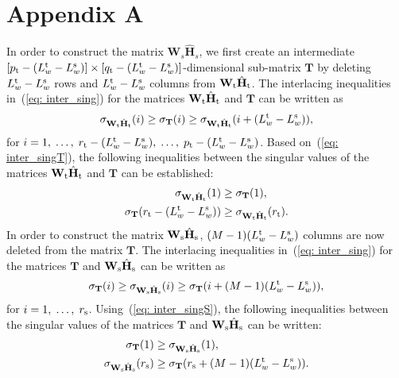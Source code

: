 \documentclass[twocolumn]{bmcart}%
\begin{document}
\section*{Appendix A}
\label{app: sing_vals}
In order to construct the matrix $\mathbf{W}_s\hat{\mathbf{H}}_s$, we first create an intermediate $[p_{\rm t}-(L^{\rm t}_w-L^{\rm s}_w)] \times [q_{\rm t}-(L^{\rm t}_w-L^{\rm s}_w)]$-dimensional sub-matrix $\mathbf{T}$ by deleting $L^{\rm t}_w-L^{\rm s}_w$ rows and $L^{\rm t}_w-L^{\rm s}_w$ columns from $\mathbf{W}_{\rm t}\hat{\mathbf{H}}_{\rm t}$.
The interlacing inequalities in~(\ref{eq: inter_sing}) for the matrices $\mathbf{W}_{\rm t}\hat{\mathbf{H}}_{\rm t}$ and $\mathbf{T}$ can be written as
\begin{equation}
\label{eq: inter_singT}
\sigma_{\mathbf{W}_{\rm t}\hat{\mathbf{H}}_{\rm t}}(i) \geq \sigma_{\mathbf{T}}(i) \geq \sigma_{\mathbf{W}_{\rm t}\hat{\mathbf{H}}_{\rm t}}(i+(L^{\rm t}_w-L^{\rm s}_w)),
\end{equation}
for $i = 1, \; \ldots, \; r_{\rm t}-(L^{\rm t}_w-L^{\rm s}_w), \; \ldots, \; p_{\rm t}-(L^{\rm t}_w-L^{\rm s}_w)$.
Based on~(\ref{eq: inter_singT}), the following inequalities between the singular values of the matrices $\mathbf{W}_{\rm t}\hat{\mathbf{H}}_{\rm t}$ and $\mathbf{T}$ can be established:
\begin{align}
\label{eq: ineq1}
\sigma_{\mathbf{W}_{\rm t}\hat{\mathbf{H}}_{\rm t}}(1) & \geq \sigma_{\mathbf{T}}(1), \\
\label{eq: ineq2}
\sigma_{\mathbf{T}}(r_{\rm t}-(L^{\rm t}_w-L^{\rm s}_w)) &\geq \sigma_{\mathbf{W}_{\rm t}\hat{\mathbf{H}}_{\rm t}}(r_{\rm t}).
\end{align}
In order to construct the matrix $\mathbf{W}_{\rm s}\hat{\mathbf{H}}_{\rm s}$, $(M-1)(L^{\rm t}_w-L^{\rm s}_w)$ columns are now deleted from the matrix $\mathbf{T}$.
The interlacing inequalities in~(\ref{eq: inter_sing}) for the matrices $\mathbf{T}$ and $\mathbf{W}_{\rm s}\hat{\mathbf{H}}_{\rm s}$ can be written as
\begin{equation}
\label{eq: inter_singS}
\sigma_{\mathbf{T}}(i) \geq \sigma_{\mathbf{W}_{\rm s}\hat{\mathbf{H}}_{\rm s}}(i) \geq \sigma_{\mathbf{T}}(i+(M-1)(L^{\rm t}_w-L^{\rm s}_w)),  
\end{equation}
for $i = 1, \; \ldots, \; r_{\rm s}$.
Using~(\ref{eq: inter_singS}), the following inequalities between the singular values of the matrices $\mathbf{T}$ and $\mathbf{W}_{\rm s}\hat{\mathbf{H}}_{\rm s}$ can be written:
\begin{align}
\label{eq: ineq3}
\sigma_{\mathbf{T}}(1) & \geq \sigma_{\mathbf{W}_{\rm s}\hat{\mathbf{H}}_{\rm s}}(1), \\
\label{eq: ineq4}
\sigma_{\mathbf{W}_{\rm s}\hat{\mathbf{H}}_{\rm s}}(r_{\rm s}) & \geq \sigma_{\mathbf{T}}(r_{\rm s}+(M-1)(L^{\rm t}_w-L^{\rm s}_w)).
\end{align}
\end{document}
